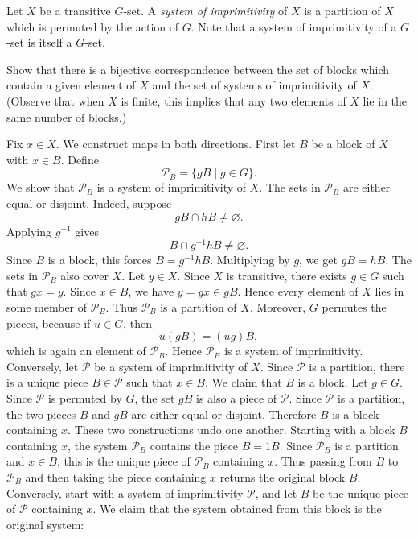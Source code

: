 \documentclass[../Odyssey_Project.tex]{subfiles}
\begin{document}
Let $X$ be a transitive $G$-set. A \emph{system of imprimitivity} of $X$ is a partition of $X$ which is permuted by the action of $G$. Note that a system of imprimitivity of a $G$-set is itself a $G$-set.

\begin{exercise}
\label{ex:3.9}
Show that there is a bijective correspondence between the set of blocks which contain a given element of $X$ and the set of systems of imprimitivity of $X$. (Observe that when $X$ is finite, this implies that any two elements of $X$ lie in the same number of blocks.)
\end{exercise}
\begin{solution}
    Fix $x \in X$. We construct maps in both directions.
    First let $B$ be a block of $X$ with $x \in B$. Define
    \[
        \mathcal{P}_B = \{gB \mid g \in G\}.
    \]
    We show that $\mathcal{P}_B$ is a system of imprimitivity of $X$.
    The sets in $\mathcal{P}_B$ are either equal or disjoint. Indeed, suppose
    \[
        gB \cap hB \neq \varnothing.
    \]
    Applying $g^{-1}$ gives
    \[
        B \cap g^{-1}hB \neq \varnothing.
    \]
    Since $B$ is a block, this forces $B = g^{-1}hB$. Multiplying by $g$, we get $gB = hB$.
    The sets in $\mathcal{P}_B$ also cover $X$. Let $y \in X$. Since $X$ is transitive, there exists $g \in G$ such that $gx = y$. Since $x \in B$, we have $y = gx \in gB$. Hence every element of $X$ lies in some member of $\mathcal{P}_B$.
    Thus $\mathcal{P}_B$ is a partition of $X$. Moreover, $G$ permutes the pieces, because if $u \in G$, then
    \[
        u(gB) = (ug)B,
    \]
    which is again an element of $\mathcal{P}_B$. Hence $\mathcal{P}_B$ is a system of imprimitivity.
    Conversely, let $\mathcal{P}$ be a system of imprimitivity of $X$. Since $\mathcal{P}$ is a partition, there is a unique piece $B \in \mathcal{P}$ such that $x \in B$. We claim that $B$ is a block. Let $g \in G$. Since $\mathcal{P}$ is permuted by $G$, the set $gB$ is also a piece of $\mathcal{P}$. Since $\mathcal{P}$ is a partition, the two pieces $B$ and $gB$ are either equal or disjoint. Therefore $B$ is a block containing $x$.
    These two constructions undo one another. Starting with a block $B$ containing $x$, the system $\mathcal{P}_B$ contains the piece $B = 1B$. Since $\mathcal{P}_B$ is a partition and $x \in B$, this is the unique piece of $\mathcal{P}_B$ containing $x$. Thus passing from $B$ to $\mathcal{P}_B$ and then taking the piece containing $x$ returns the original block $B$.
    Conversely, start with a system of imprimitivity $\mathcal{P}$, and let $B$ be the unique piece of $\mathcal{P}$ containing $x$. We claim that the system obtained from this block is the original system:

\end{solution}
\end{document}
